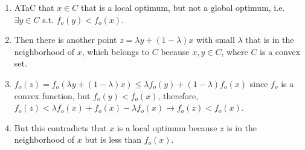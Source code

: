 \begin{derivation}
    \begin{enumerate}
        \item ATaC that $x \in C$ that is a local optimum, but not a global optimum, i.e. $\exists y \in C$ s.t. $f_o(y) < f_o(x)$.
        \item Then there is another point $z = \lambda y + (1-\lambda) x$ with small $\lambda$ that is in the neighborhood of $x$, which belongs to $C$ because $x,y \in C$, where $C$ is a convex set.
        \item $f_o (z) = f_o (\lambda y + (1-\lambda) x) \leq \lambda f_o (y) + (1-\lambda) f_o (x)$ since $f_o$ is a convex function, but $f_o(y) < f_o(x)$, therefore, $f_o(z) < \lambda f_o(x) + f_o (x) - \lambda f_o(x) \rightarrow f_o(z) < f_o(x)$.
        \item But this contradicts that $x$ is a local optimum because $z$ is in the neighborhood of $x$ but is less than $f_o(x)$.
    \end{enumerate}
\end{derivation}

